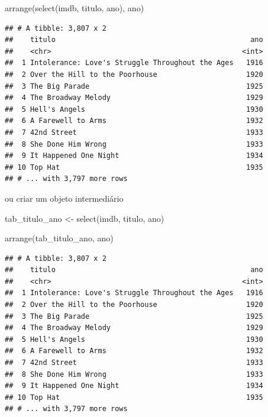 \documentclass[
]{book}
\newenvironment{Shaded}{\begin{snugshade}}{\end{snugshade}}
\newcommand{\FunctionTok}[1]{\textcolor[rgb]{0.00,0.00,0.00}{#1}}
\newcommand{\NormalTok}[1]{#1}
\newcommand{\OtherTok}[1]{\textcolor[rgb]{0.56,0.35,0.01}{#1}}
\begin{document}
\begin{Shaded}
\begin{Highlighting}[]
\FunctionTok{arrange}\NormalTok{(}\FunctionTok{select}\NormalTok{(imdb, titulo, ano), ano)}
\end{Highlighting}
\end{Shaded}

\begin{verbatim}
## # A tibble: 3,807 x 2
##    titulo                                              ano
##    <chr>                                             <int>
##  1 Intolerance: Love's Struggle Throughout the Ages   1916
##  2 Over the Hill to the Poorhouse                     1920
##  3 The Big Parade                                     1925
##  4 The Broadway Melody                                1929
##  5 Hell's Angels                                      1930
##  6 A Farewell to Arms                                 1932
##  7 42nd Street                                        1933
##  8 She Done Him Wrong                                 1933
##  9 It Happened One Night                              1934
## 10 Top Hat                                            1935
## # ... with 3,797 more rows
\end{verbatim}

ou criar um objeto intermediário

\begin{Shaded}
\begin{Highlighting}[]
\NormalTok{tab\_titulo\_ano }\OtherTok{\textless{}{-}} \FunctionTok{select}\NormalTok{(imdb, titulo, ano)}

\FunctionTok{arrange}\NormalTok{(tab\_titulo\_ano, ano)}
\end{Highlighting}
\end{Shaded}

\begin{verbatim}
## # A tibble: 3,807 x 2
##    titulo                                              ano
##    <chr>                                             <int>
##  1 Intolerance: Love's Struggle Throughout the Ages   1916
##  2 Over the Hill to the Poorhouse                     1920
##  3 The Big Parade                                     1925
##  4 The Broadway Melody                                1929
##  5 Hell's Angels                                      1930
##  6 A Farewell to Arms                                 1932
##  7 42nd Street                                        1933
##  8 She Done Him Wrong                                 1933
##  9 It Happened One Night                              1934
## 10 Top Hat                                            1935
## # ... with 3,797 more rows
\end{verbatim}
\end{document}
